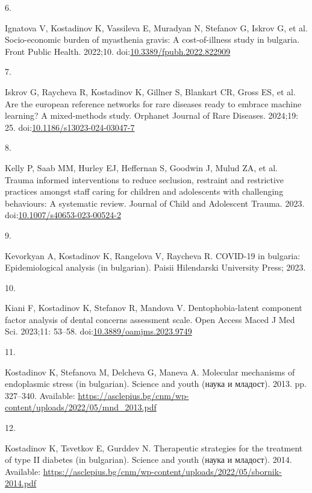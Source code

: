 \documentclass[
  12pt,
  letterpaper,
  DIV=11,
  numbers=noendperiod]{scrartcl}
\newlength{\cslhangindent}
\newlength{\csllabelwidth}
\newenvironment{CSLReferences}[2] %
 {\begin{list}{}{%
  \setlength{\itemindent}{0pt}
  \setlength{\leftmargin}{0pt}
  \setlength{\parsep}{0pt}
  \ifodd #1
   \setlength{\leftmargin}{\cslhangindent}
   \setlength{\itemindent}{-1\cslhangindent}
  \fi
  \setlength{\itemsep}{#2\baselineskip}}}
 {\end{list}}
\newcommand{\CSLLeftMargin}[1]{\parbox[t]{\csllabelwidth}{\strut#1\strut}}
\newcommand{\CSLRightInline}[1]{\parbox[t]{\linewidth - \csllabelwidth}{\strut#1\strut}}
\begin{document}
\begin{CSLReferences}{0}{1}
\CSLLeftMargin{6. }%
\CSLRightInline{Ignatova V, Kostadinov K, Vassileva E, Muradyan N,
Stefanov G, Iskrov G, et al. Socio-economic burden of myasthenia gravis:
A cost-of-illness study in bulgaria. Front Public Health. 2022;10.
doi:\href{https://doi.org/10.3389/fpubh.2022.822909}{10.3389/fpubh.2022.822909}}

\CSLLeftMargin{7. }%
\CSLRightInline{Iskrov G, Raycheva R, Kostadinov K, Gillner S, Blankart
CR, Gross ES, et al. Are the european reference networks for rare
diseases ready to embrace machine learning? A mixed-methods study.
Orphanet Journal of Rare Diseases. 2024;19: 25.
doi:\href{https://doi.org/10.1186/s13023-024-03047-7}{10.1186/s13023-024-03047-7}}

\CSLLeftMargin{8. }%
\CSLRightInline{Kelly P, Saab MM, Hurley EJ, Heffernan S, Goodwin J,
Mulud ZA, et al. Trauma informed interventions to reduce seclusion,
restraint and restrictive practices amongst staff caring for children
and adolescents with challenging behaviours: A systematic review.
Journal of Child and Adolescent Trauma. 2023.
doi:\href{https://doi.org/10.1007/s40653-023-00524-2}{10.1007/s40653-023-00524-2}}

\CSLLeftMargin{9. }%
\CSLRightInline{Kevorkyan A, Kostadinov K, Rangelova V, Raycheva R.
COVID-19 in bulgaria: Epidemiological analysis (in bulgarian). Paisii
Hilendarski University Press; 2023. }

\CSLLeftMargin{10. }%
\CSLRightInline{Kiani F, Kostadinov K, Stefanov R, Mandova V.
Dentophobia-latent component factor analysis of dental concerns
assessment scale. Open Access Maced J Med Sci. 2023;11: 53--58.
doi:\href{https://doi.org/10.3889/oamjms.2023.9749}{10.3889/oamjms.2023.9749}}

\CSLLeftMargin{11. }%
\CSLRightInline{Kostadinov K, Stefanova M, Delcheva G, Maneva A.
Molecular mechanisms of endoplasmic stress (in bulgarian). Science and
youth (наука и младост). 2013. pp. 327--340. Available:
\url{https://asclepius.bg/cnm/wp-content/uploads/2022/05/mnd_2013.pdf}}

\CSLLeftMargin{12. }%
\CSLRightInline{Kostadinov K, Tsvetkov E, Gurddev N. Therapeutic
strategies for the treatment of type II diabetes (in bulgarian). Science
and youth (наука и младост). 2014. Available:
\url{https://asclepius.bg/cnm/wp-content/uploads/2022/05/sbornik-2014.pdf}}


\end{CSLReferences}
\end{document}
